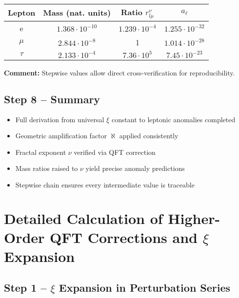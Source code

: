 \documentclass[12pt,a4paper]{article}
\begin{document}
\begin{tabular}{|c|c|c|c|}
	\hline
	Lepton & Mass (nat. units) & Ratio $r_{l\mu}^{\nu}$ & $a_\ell$ \\
	\hline
	e & $1.368 \cdot 10^{-10}$ & $1.239 \cdot 10^{-4}$ & $1.255 \cdot 10^{-32}$ \\
	\hline
	$\mu$ & $2.844 \cdot 10^{-8}$ & 1 & $1.014 \cdot 10^{-28}$ \\
	\hline
	$\tau$ & $2.133 \cdot 10^{-4}$ & $7.36 \cdot 10^5$ & $7.45 \cdot 10^{-23}$ \\
	\hline
\end{tabular}

\textbf{Comment:} Stepwise values allow direct cross-verification for reproducibility.

\subsection{Step 8 – Summary}

\begin{itemize}
	\item Full derivation from universal $\xi$ constant to leptonic anomalies completed
	\item Geometric amplification factor $\aleph$ applied consistently
	\item Fractal exponent \(\nu\) verified via QFT correction
	\item Mass ratios raised to \(\nu\) yield precise anomaly predictions
	\item Stepwise chain ensures every intermediate value is traceable
\end{itemize}
\section{Detailed Calculation of Higher-Order QFT Corrections and $\xi$ Expansion}

\subsection{Step 1 – $\xi$ Expansion in Perturbation Series}
\end{document}
